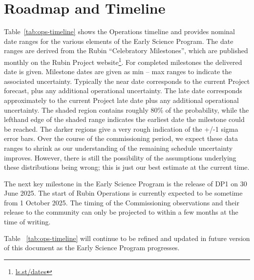 \section{Roadmap and Timeline} \label{sec:timeline}

Table~\ref{tab:ops-timeline} shows the Operations timeline and provides nominal date ranges for the various elements of the Early Science Program.
The date ranges are derived from the Rubin ``Celebratory Milestones'', which are  published monthly on the Rubin Project website\footnote{\url{ls.st/dates}}. 
For completed milestones the delivered date is given. 
Milestone dates are given as min -- max ranges to indicate the associated uncertainty. 
Typically the near date corresponds to the current Project forecast, plus any additional operational uncertainty.
The late date corresponds approximately to the current Project late date plus any additional operational uncertainty.
The shaded region contains roughly 80\% of the probability, while the lefthand edge of the shaded range indicates the earliest date the milestone could be reached. 
The darker regions give a very rough indication of the +/-1 sigma error bars.
Over the course of the commissioning period, we expect these data ranges to shrink as our understanding of the remaining schedule uncertainty improves. 
However, there is still the possibility of the assumptions underlying these distributions being wrong; this is just our best estimate at the current time.



The next key milestone in the Early Science Program is the release of DP1 on  30 June 2025. 
The  start of Rubin Operations is currently expected to be sometime from 1 October 2025.
The timing of the Commissioning observations and their release to the community can only be projected to within a few months at the time of writing.

Table ~\ref{tab:ops-timeline} will continue to be refined and updated in future version of this document as the Early Science Program progresses.

